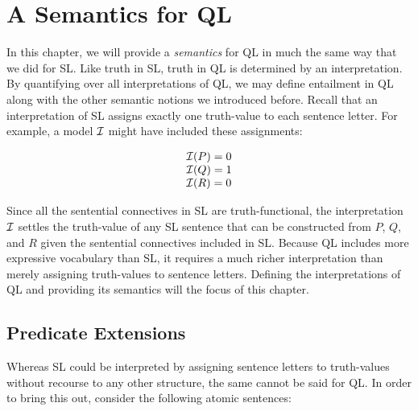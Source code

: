 ﻿%
\chapter{A Semantics for QL}
\label{ch.FOL-semantics}


In this chapter, we will provide a \emph{semantics} for QL in much the same way that we did for SL.
Like truth in SL, truth in QL is determined by an interpretation.
By quantifying over all interpretations of QL, we may define entailment in QL along with the other semantic notions we introduced before.
Recall that an interpretation of SL assigns exactly one truth-value to each sentence letter.
For example, a model $\mathcal{I}$ might have included these assignments:

\begin{displaymath}
	\begin{array}{ll}
    \mathcal{I}(P) = 0\\
    \mathcal{I}(Q) = 1\\
    \mathcal{I}(R) = 0
	\end{array}
\end{displaymath}

Since all the sentential connectives in SL are truth-functional, the interpretation $\mathcal{I}$ settles the truth-value of any SL sentence that can be constructed from $P$, $Q$, and $R$ given the sentential connectives included in SL.
Because QL includes more expressive vocabulary than SL, it requires a much richer interpretation than merely assigning truth-values to sentence letters.
Defining the interpretations of QL and providing its semantics will the focus of this chapter.





\section{Predicate Extensions}

Whereas SL could be interpreted by assigning sentence letters to truth-values without recourse to any other structure, the same cannot be said for QL.
In order to bring this out, consider the following atomic sentences:

